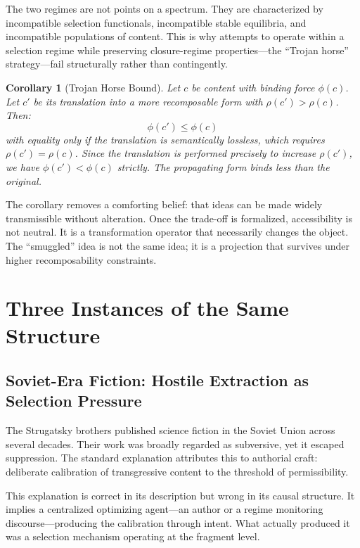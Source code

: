 \documentclass[12pt]{article}
\newtheorem{corollary}{Corollary}[theorem]
\newcommand{\bind}{\phi}
\newcommand{\recomp}{\rho}
\begin{document}
The two regimes are not points on a spectrum. They are characterized by
incompatible selection functionals, incompatible stable equilibria, and
incompatible populations of content. This is why attempts to operate
within a selection regime while preserving closure-regime
properties---the ``Trojan horse'' strategy---fail structurally rather
than contingently.

\begin{corollary}[Trojan Horse Bound]
\label{cor:trojan}
Let $c$ be content with binding force $\bind(c)$. Let $c'$ be its
translation into a more recomposable form with $\recomp(c') >
\recomp(c)$. Then:
\[
\bind(c') \leq \bind(c)
\]
with equality only if the translation is semantically lossless, which
requires $\recomp(c') = \recomp(c)$. Since the translation is performed
precisely to increase $\recomp(c')$, we have $\bind(c') < \bind(c)$
strictly. The propagating form binds less than the original.
\end{corollary}

The corollary removes a comforting belief: that ideas can be made widely
transmissible without alteration. Once the trade-off is formalized,
accessibility is not neutral. It is a transformation operator that
necessarily changes the object. The ``smuggled'' idea is not the same
idea; it is a projection that survives under higher recomposability
constraints.

\section{Three Instances of the Same Structure}
\label{sec:instances}

\subsection{Soviet-Era Fiction: Hostile Extraction as Selection Pressure}
\label{ssec:soviet}

The Strugatsky brothers published science fiction in the Soviet Union
across several decades. Their work was broadly regarded as subversive,
yet it escaped suppression. The standard explanation attributes this to
authorial craft: deliberate calibration of transgressive content to the
threshold of permissibility.

This explanation is correct in its description but wrong in its causal
structure. It implies a centralized optimizing agent---an author or a
regime monitoring discourse---producing the calibration through intent.
What actually produced it was a selection mechanism operating at the
fragment level.
\end{document}
